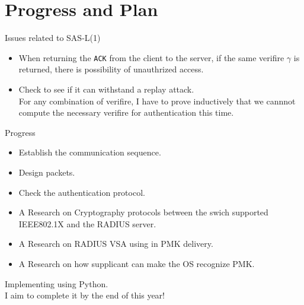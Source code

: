 \section{Progress and Plan}
\toc
\begin{frame}{\fft}
    \begin{alertblock}{Issues related to SAS-L(1)}
        \begin{itemize}
            \setlength{\itemsep}{1em}
            \item[\cmark] When returning the \texttt{ACK} from the client to the server,
                if the same verifire \(\gamma\) is returned, there is possibility of unauthrized access.
            \item Check to see if it can withstand a replay attack. \\
                  For any combination of verifire, I have to prove inductively that we cannnot compute the necessary verifire for authentication this time.
        \end{itemize}
    \end{alertblock}
\end{frame}
\begin{frame}{\fft}
    \begin{exampleblock}{Progress}
        \begin{itemize}
            \item[\cmark] Establish the communication sequence.
            \item[\cmark] Design packets.
            \item[\cmark] Check the authentication protocol.
            \item A Research on Cryptography protocols between the swich supported IEEE802.1X and the RADIUS server.
            \item A Research on RADIUS VSA using in PMK delivery.
            \item A Research on how supplicant can make the OS recognize PMK.
        \end{itemize}
    \end{exampleblock}
    Implementing using Python.\\
    \hfill I aim to complete it by the end of this year!
\end{frame}